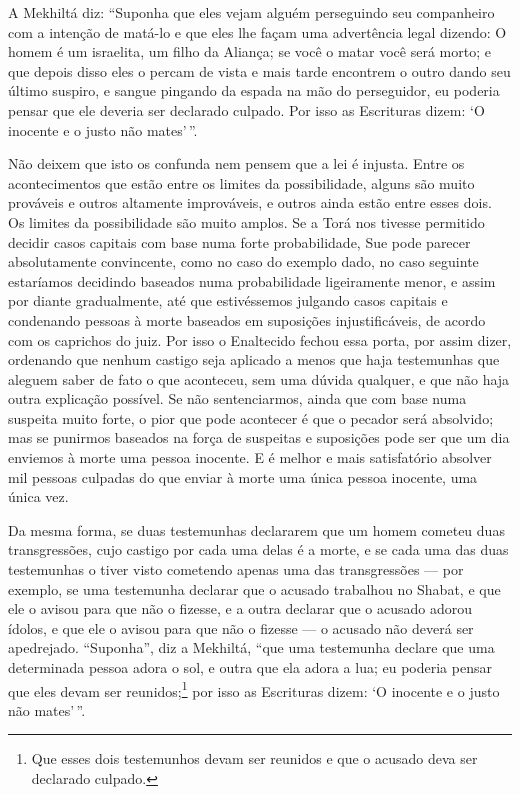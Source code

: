 A Mekhiltá diz: ``Suponha que eles vejam alguém perseguindo seu
companheiro com a intenção de matá-lo e que eles lhe façam uma
advertência legal dizendo: O homem é um israelita, um filho da Aliança;
se você o matar você será morto; e que depois disso eles o percam de
vista e mais tarde encontrem o outro dando seu último suspiro, e sangue
pingando da espada na mão do perseguidor, eu poderia pensar que ele
deveria ser declarado culpado. Por isso as Escrituras dizem: `O inocente
e o justo não mates'\,''.

Não deixem que isto os confunda nem pensem que a lei é injusta. Entre os
acontecimentos que estão entre os limites da possibilidade, alguns são
muito prováveis e outros altamente improváveis, e outros ainda estão
entre esses dois. Os limites da possibilidade são muito amplos. Se a
Torá nos tivesse permitido decidir casos capitais com base numa forte
probabilidade, Sue pode parecer absolutamente convincente, como no caso
do exemplo dado, no caso seguinte estaríamos decidindo baseados numa
probabilidade ligeiramente menor, e assim por diante gradualmente, até
que estivéssemos julgando casos capitais e condenando pessoas à morte
baseados em suposições injustificáveis, de acordo com os caprichos do
juiz. Por isso o Enaltecido fechou essa porta, por assim dizer,
ordenando que nenhum castigo seja aplicado a menos que haja testemunhas
que aleguem saber de fato o que aconteceu, sem uma dúvida qualquer, e
que não haja outra explicação possível. Se não sentenciarmos, ainda que
com base numa suspeita muito forte, o pior que pode acontecer é que o
pecador será absolvido; mas se punirmos baseados na força de suspeitas e
suposições pode ser que um dia enviemos à morte uma pessoa inocente. E é
melhor e mais satisfatório absolver mil pessoas culpadas do que enviar à
morte uma única pessoa inocente, uma única vez.

Da mesma forma, se duas testemunhas declararem que um homem cometeu duas
transgressões, cujo castigo por cada uma delas é a morte, e se cada uma
das duas testemunhas o tiver visto cometendo apenas uma das
transgressões --- por exemplo, se uma testemunha declarar que o acusado
trabalhou no Shabat, e que ele o avisou para que não o fizesse, e a
outra declarar que o acusado adorou ídolos, e que ele o avisou para que
não o fizesse --- o acusado não deverá ser apedrejado. ``Suponha'', diz
a Mekhiltá, ``que uma testemunha declare que uma determinada pessoa
adora o sol, e outra que ela adora a lua;
eu poderia pensar que eles devam ser reunidos;\footnote{Que esses dois testemunhos devam ser reunidos e que o acusado deva ser declarado culpado.} por
isso as Escrituras dizem: `O inocente e o justo não mates'\,''.

